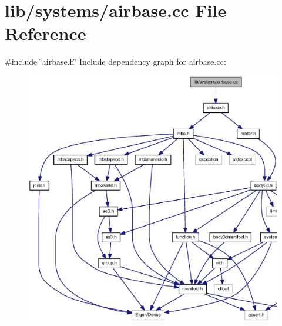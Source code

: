 \section{lib/systems/airbase.cc \-File \-Reference}
\label{airbase_8cc}
{\ttfamily \#include \char`\"{}airbase.\-h\char`\"{}}\*
\-Include dependency graph for airbase.\-cc\-:\nopagebreak
\begin{figure}[H]
\begin{center}
\leavevmode
\includegraphics[width=350pt]{airbase_8cc__incl}
\end{center}
\end{figure}
